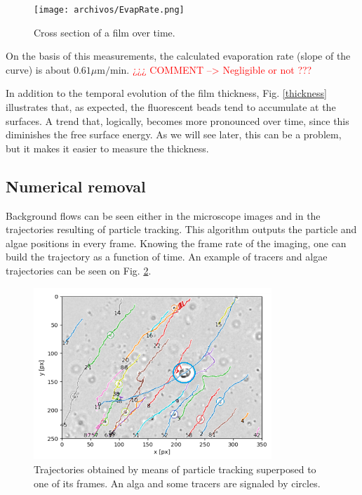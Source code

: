 \begin{figure}[H]
	\centering
	\texttt{[image: archivos/EvapRate.png]}
	\caption{Cross section of a film over time.}
	\label{evap_rate}
\end{figure}

On the basis of this measurements, the calculated evaporation rate (slope of the curve) is about $ 0.61 \mu \textrm{m/min}$. \textcolor{red}{¿¿¿ COMMENT --> Negligible or not ???}

In addition to the temporal evolution of the film thickness, Fig. \ref{thickness} illustrates that, as expected, the fluorescent beads tend to accumulate at the surfaces. A trend that, logically, becomes more pronounced over time, since this diminishes the free surface energy. As we will see later, this can be a problem, but it makes it easier to measure the thickness.

\subsection{Numerical removal}

Background flows can be seen either in the microscope images and in the trajectories resulting of particle tracking. This algorithm outputs the particle and algae positions in every frame. Knowing the frame rate of the imaging, one can build the trajectory as a function of time. An example of tracers and algae trajectories can be seen on Fig. \ref{trajectories_e3}.

\begin{figure}[H]
	\centering
	\includegraphics[width=0.8\textwidth]{archivos/trajectories_e3.png}
	\caption{Trajectories obtained by means of particle tracking superposed to one of its frames. An alga and some tracers are signaled by circles.}
	\label{trajectories_e3}
\end{figure}

